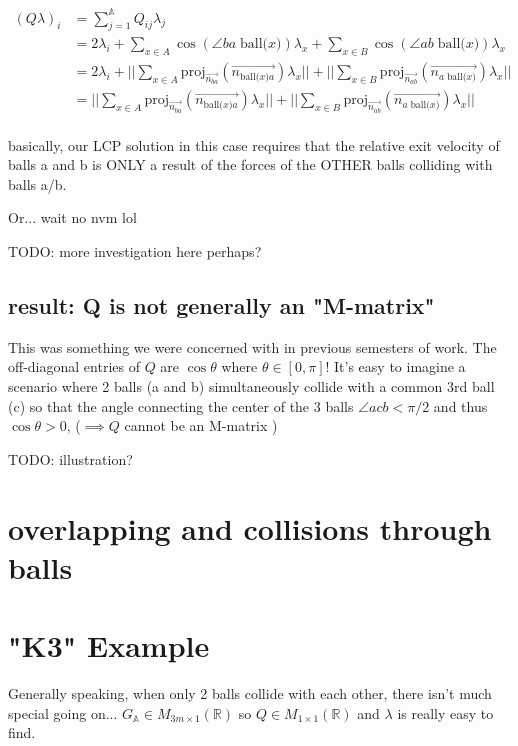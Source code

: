 \documentclass[12pt]{article}
\newcommand{\bigA}{{\mathbb{A}}}
\newcommand{\ball}[1]{\text{ball(} #1 \text{)}}
\newcommand{\proj}[2]{\text{proj}_{#1}(#2)}
\newcommand{\realm}[2]{ M_{#1 \times #2}(\mathbb{R})}
\begin{document}
\begin{align*}
(Q \lambda)_i &= \sum_{j = 1}^{\bigA} Q_{ij} \lambda_j\\
    &= 2\lambda_i + \sum_{x \in A}^{} \cos(\angle ba\;\ball{x})\lambda_x + \sum_{x \in B}^{} \cos(\angle ab\;\ball{x})\lambda_x\\
    &= 2\lambda_i
        + ||\sum_{x \in A}^{}\proj{\overrightarrow{n_{ba}}}{\overrightarrow{n_{\ball{x}a}}} \lambda_x||
        + ||\sum_{x \in B}^{}\proj{\overrightarrow{n_{ab}}}{\overrightarrow{n_{a\;\ball{x}}}} \lambda_x||\\
    &= ||\sum_{x \in A}^{}\proj{\overrightarrow{n_{ba}}}{\overrightarrow{n_{\ball{x}a}}} \lambda_x||
        + ||\sum_{x \in B}^{}\proj{\overrightarrow{n_{ab}}}{\overrightarrow{n_{a\;\ball{x}}}} \lambda_x||\\
\end{align*}

basically, our LCP solution in this case requires that the relative exit velocity of balls
a and b is ONLY a result of the forces of the OTHER balls colliding with balls a/b.

Or... wait no nvm lol

TODO: more investigation here perhaps?

\subsection*{result: Q is not generally an "M-matrix"}

This was something we were concerned with in previous semesters of work.
The off-diagonal entries of $Q$ are $\cos \theta$ where $\theta \in [0, \pi]$!
It's easy to imagine a scenario where 2 balls (a and b) 
simultaneously collide with a common 3rd ball (c) so that the angle
connecting the center of the 3 balls $\angle acb < \pi / 2$
and thus $\cos \theta > 0$, ($\implies Q$ cannot be an M-matrix )

TODO: illustration?

\section{overlapping and collisions through balls}

\section{"K3" Example}

Generally speaking, when only 2 balls collide with each other, there isn't much
special going on... $G_\bigA \in \realm{3m}{1}$ so $Q \in \realm{1}{1}$ and $\lambda$ is
really easy to find.
\end{document}
